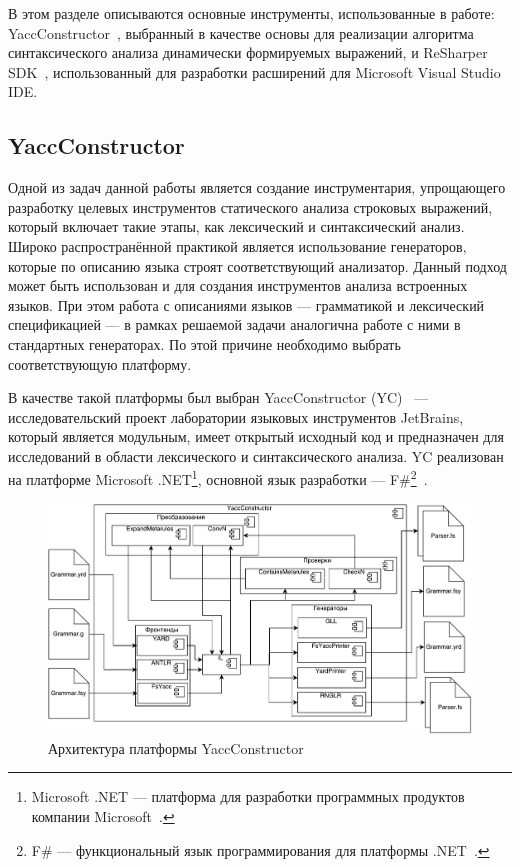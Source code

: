 В этом разделе описываются основные инструменты, использованные в работе: YaccConstructor~\cite{YCArticle, YCUrl}, выбранный в качестве основы для реализации алгоритма синтаксического анализа динамически формируемых выражений, и ReSharper SDK~\cite{ReSharperSDK}, использованный для разработки расширений для Microsoft Visual Studio IDE.  

\subsection{YaccConstructor}\label{YCDescr}

    Одной из задач данной работы является создание инструментария, упрощающего разработку целевых инструментов статического анализа строковых выражений, который включает такие этапы, как лексический и синтаксический анализ. Широко распространённой практикой является использование генераторов, которые по описанию языка строят соответствующий анализатор. Данный подход может быть использован и для создания инструментов анализа встроенных языков.
    При этом работа с описаниями языков --- грамматикой и лексический спецификацией --- в рамках решаемой задачи аналогична работе с ними в стандартных генераторах. По этой причине необходимо выбрать соответствующую платформу.

    В качестве такой платформы был выбран YaccConstructor (YC)~\cite{YCArticle, YCUrl} --- исследовательский проект лаборатории языковых инструментов JetBrains, который является модульным, имеет открытый исходный код и предназначен для исследований в области лексического и синтаксического анализа. YC реализован на платформе Microsoft .NET\footnote{Microsoft .NET --- платформа для разработки программных продуктов компании Microsoft~\cite{MSNETURL}.}, основной язык разработки --- F\#\footnote{F\# --- функциональный язык программирования для платформы .NET~\cite{FSharpURL}.}~\cite{FSharp}.

\begin{figure}[h!]
\begin{center}
\includegraphics[width=\textwidth]{pics/YCArch.pdf}
\caption{Архитектура платформы YaccConstructor}
\label{fig:ycarch} 
\end{center}
\end{figure}

